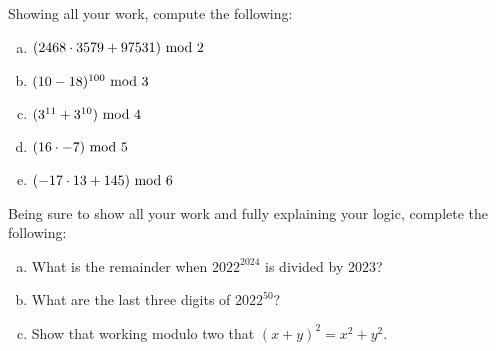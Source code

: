 \documentclass[12pt,letterpaper]{exam}
\begin{document}
\begin{questions}
\sol {\itshape
\begin{enumerate}[(a)]
\item 
\item 
\item 
\item 
\item 
\end{enumerate}
}



\newpage
\question[10] Showing all your work, compute the following:
	\begin{enumerate}[(a)]
	\item $(2468 \cdot 3579 + 97531) \text{ mod } 2$
	\item $(10 - 18)^{100} \text{ mod } 3$
	\item $(3^{11} + 3^{10}) \text{ mod } 4$
	\item $(16 \cdot -7) \text{ mod } 5$
	\item $(-17 \cdot 13 + 145) \text{ mod } 6$
	\end{enumerate} \pspace




\newpage
\question[10] Being sure to show all your work and fully explaining your logic, complete the following:
	\begin{enumerate}[(a)]
	\item What is the remainder when $2022^{2024}$ is divided by $2023$?
	\item What are the last three digits of $2022^{50}$?
	\item Show that working modulo two that $(x + y)^2= x^2 + y^2$. 
	\end{enumerate} \pspace


\end{questions}
\end{document}
